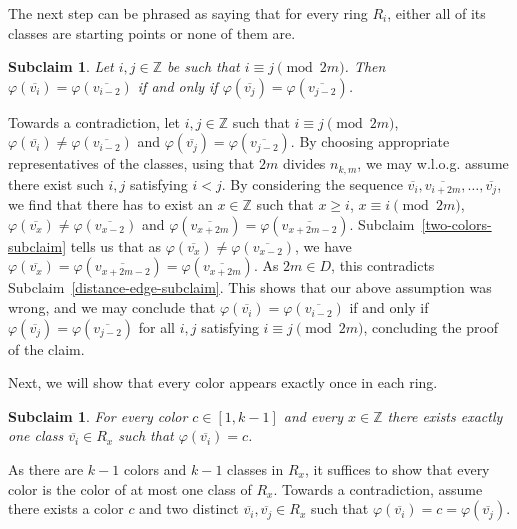 \documentclass[a4paper,10pt,hidelinks]{amsart}
\newtheorem{subclaim}[theorem]{Subclaim}
\newenvironment{claimproof}[1][\proofname]{\proof[#1]\renewcommand{\qedsymbol}{$\blacksquare$}}{\endproof}
\newenvironment{subclaimproof}[1][\proofname]{\proof[#1]\renewcommand{\qedsymbol}{$\blacklozenge$}}{\endproof}
\theoremstyle{definition}
\begin{document}
\begin{claimproof}[Proof of Claim~\ref{structure-claim} when $k \in \{6,8\}$]
        The next step can be phrased as saying that for every ring $R_i$, either all of its classes are starting points or none of them are.
        \begin{subclaim}\label{same-choice-subclaim}
            Let $i,j \in \mathbb{Z}$ be such that $i \equiv j \pmod{2m}$. Then $\varphi(\overline{v_i}) = \varphi(\overline{v_{i - 2}})$ if and only if $\varphi(\overline{v_j}) = \varphi(\overline{v_{j - 2}})$.
        \end{subclaim}
        \begin{subclaimproof}
            Towards a contradiction, let $i, j \in \mathbb{Z}$ such that $i \equiv j \pmod{2m}$, $\varphi(\overline{v_i}) \neq \varphi(\overline{v_{i - 2}})$ and $\varphi(\overline{v_j}) = \varphi(\overline{v_{j - 2}})$. By choosing appropriate representatives of the classes, using that $2m$ divides $n_{k,m}$, we may w.l.o.g. assume there exist such $i, j$ satisfying $i < j$. By considering the sequence $\overline{v_i}, \overline{v_{i+2m}},\ldots,\overline{v_j}$, we find that there has to exist an $x \in \mathbb{Z}$ such that $x \geq i$, $x \equiv i \pmod{2m}$, $\varphi(\overline{v_x}) \neq \varphi(\overline{v_{x-2}})$ and $\varphi(\overline{v_{x + 2m}}) = \varphi(\overline{v_{x+2m - 2}})$. Subclaim~\ref{two-colors-subclaim} tells us that as $\varphi(\overline{v_{x}}) \neq \varphi(\overline{v_{x - 2}})$, we have $\varphi(\overline{v_x}) = \varphi(\overline{v_{x + 2m - 2}})=\varphi(\overline{v_{x + 2m}})$. As $2m \in D$, this contradicts Subclaim~\ref{distance-edge-subclaim}. This shows that our above assumption was wrong, and we may conclude that $\varphi(\overline{v_i}) = \varphi(\overline{v_{i - 2}})$ if and only if $\varphi(\overline{v_j}) = \varphi(\overline{v_{j - 2}})$ for all $i, j$ satisfying $i \equiv j \pmod{2m}$, concluding the proof of the claim.
        \end{subclaimproof}

        Next, we will show that every color appears exactly once in each ring.
        \begin{subclaim}\label{each-color-ring-subclaim}
            For every color $c\in [1, k -1]$ and every $x \in \mathbb{Z}$ there exists exactly one class $\overline{v_{i}} \in R_x$ such that $\varphi(\overline{v_{i}}) = c$.
        \end{subclaim}
        \begin{subclaimproof}
            As there are $k-1$ colors and $k-1$ classes in $R_x$, it suffices to show that every color is the color of at most one class of $R_x$. Towards a contradiction, assume there exists a color $c$ and two distinct $\overline{v_i}, \overline{v_j} \in R_x$ such that $\varphi(\overline{v_i}) = c = \varphi(\overline{v_j})$.


\end{subclaimproof}
\end{claimproof}
\end{document}
